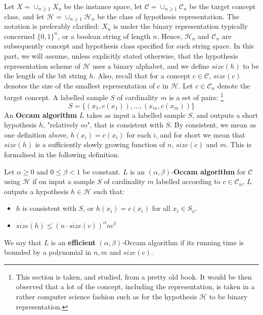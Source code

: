Let $X= \cup_{n\geq 1} X_n$ be the instance space, let $\mathcal{C}=\cup_{n\geq 1}\mathcal{C}_{n}$ be the target concept class, and let $\mathcal{H}= \cup_{n\geq 1}\mathcal{H}_{n}$ be the class of hypothesis representation. The notation is preferably clarified: $X_{n}$ is under the binary representation typically concerned $\{0,1\}^{n}$, or a boolean string of length $n$. Hence, $\mathcal{H}_{n}$ and $\mathcal{C}_{n}$ are subsequently concept and hypothesis class specified for such string space. In this part, we will assume, unless explicitly stated otherwise, that the hypothesis representation scheme of $\mathcal{H}$ uses a binary alphabet, and we define $size(h)$ to be the length of the bit string $h$. Also, recall that for a concept $c\in \mathcal{C}$, $size(c)$ denotes the size of the smallest representation of $c$ in $\mathcal{H}$. Let $c\in \mathcal{C}_{n}$ denote the target concept. A labelled sample $S$ of cardinality $m$ is a set of pairs: \footnote{This section is taken, and studied, from a pretty old book. It would be then observed that a lot of the concept, including the representation, is taken in a rather computer science fashion such as for the hypothesis $\mathcal{H}$ to be binary representation.}
\begin{equation*}
    S = \{(x_1, c(x_1)),\dots,(x_m, c(x_m))\}
\end{equation*}
An \textbf{Occam algorithm} $L$ takes as input a labelled sample $S$, and outputs a short hypothesis $h$, "relatively so", that is consistent with $S$. By consistent, we mean as one definition above, $h(x_{i})= c(x_{i})$ for each $i$, and for short we mean that $size(h)$ is a sufficiently slowly growing function of $n$, $size(c)$ and $m$. This is formalised in the following definition. 

\begin{definition}
    Let $\alpha \geq 0$ and $0\leq \beta < 1$ be constant. $L$ is an $(\alpha, \beta)$-\textbf{Occam algorithm} for $\mathcal{C}$ using $\mathcal{H}$ if on input a sample $S$ of cardinality $m$ labelled according to $c\in \mathcal{C}_{n}$, $L$ outputs a hypothesis $h\in \mathcal{H}$ such that: 
    \begin{itemize}
        \item $h$ is consistent with $S$, or $h(x_{i})=c(x_i)$ for all $x_{i}\in S_{x}$. 
        \item $size(h)\leq (n\cdot size(c))^{\alpha}m^{\beta}$
    \end{itemize}
    We say that $L$ is an \textbf{efficient} $(\alpha,\beta)$-Occam algorithm if its running time is bounded by a polynomial in $n,m$ and $size(c)$.  
\end{definition}

